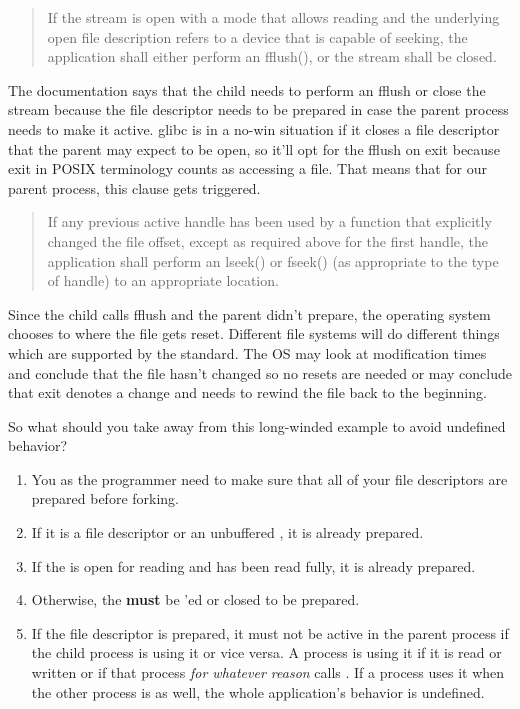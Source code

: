 \begin{quote}
If the stream is open with a mode that allows reading and the underlying open file description refers to a device that is capable of seeking, the application shall either perform an fflush(), or the stream shall be closed.
\end{quote}

The documentation says that the child needs to perform an fflush or close the stream because the file descriptor needs to be prepared in case the parent process needs to make it active.
glibc is in a no-win situation if it closes a file descriptor that the parent may expect to be open, so it'll opt for the fflush on exit because exit in POSIX terminology counts as accessing a file.
That means that for our parent process, this clause gets triggered.

\begin{quote}
If any previous active handle has been used by a function that explicitly changed the file offset, except as required above for the first handle, the application shall perform an lseek() or fseek() (as appropriate to the type of handle) to an appropriate location.
\end{quote}

Since the child calls fflush and the parent didn't prepare, the operating system chooses to where the file gets reset.
Different file systems will do different things which are supported by the standard.
The OS may look at modification times and conclude that the file hasn't changed so no resets are needed or may conclude that exit denotes a change and needs to rewind the file back to the beginning.

So what should you take away from this long-winded example to avoid undefined behavior?

\begin{enumerate}
\item You as the programmer need to make sure that all of your file descriptors are prepared before forking.
\item If it is a file descriptor or an unbuffered , it is already prepared.
\item If the  is open for reading and has been read fully, it is already prepared.
\item Otherwise, the  \textbf{must} be 'ed or closed to be prepared.
\item If the file descriptor is prepared, it must not be active in the parent process if the child process is using it or vice versa. A process is using it if it is read or written or if that process \textit{for whatever reason} calls . If a process uses it when the other process is as well, the whole application's behavior is undefined.
\end{enumerate}

